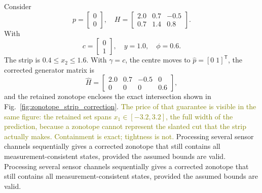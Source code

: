 \begin{example}
\label{ex:zonotope-strip}
Consider
\begin{equation}
p=
\begin{bmatrix}
0\\
0
\end{bmatrix},
\quad
H=
\begin{bmatrix}
2.0 & 0.7 & -0.5\\
0.7 & 1.4 & 0.8
\end{bmatrix}.
\end{equation}
With
\begin{equation}
c=
\begin{bmatrix}
0\\
1
\end{bmatrix},
\quad
y=1.0,\quad
\phi=0.6.
\end{equation}
The strip is $0.4\le x_2\le1.6$. With $\gamma=c$, the centre moves to $\hat p=[0\;1]^{\mathsf T}$, the corrected generator matrix is
\begin{equation}
\hat H=
\begin{bmatrix}
2.0 & 0.7 & -0.5 & 0\\
0 & 0 & 0 & 0.6
\end{bmatrix},
\end{equation}
and the retained zonotope encloses the exact intersection shown in Fig.~\ref{fig:zonotope_strip_correction}. \textcolor{olive}{The price of that guarantee is visible in the same figure: the retained set spans $x_1\in[-3.2,3.2]$, the full width of the prediction, because a zonotope cannot represent the slanted cut that the strip actually makes. Containment is exact; tightness is not.} Processing several sensor channels sequentially gives a corrected zonotope that still contains all measurement-consistent states, provided the assumed bounds are valid.
Processing several sensor channels sequentially gives a corrected zonotope that still contains all measurement-consistent states, provided the assumed bounds are valid.
\end{example}



